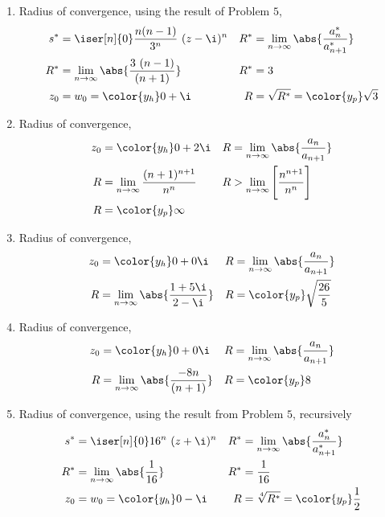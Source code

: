\begin{enumerate}
    \item Radius of convergence, using the result of Problem $ 5 $,
          \begin{align}
              s^* & = \iser[n]{0} \frac{n(n-1)}{3^n}\ (z-\i)^n          &
              R^* & = \lim_{n \to \infty} \abs{\frac{a_n^*}{a_{n+1}^*}}   \\
              R^* & = \lim_{n \to \infty} \abs{\frac{3\ (n-1)}{(n+1)}}  &
              R^* & = 3                                                   \\
              z_0 & = w_0 = \color{y_h} 0 + \i                          &
              R   & = \sqrt{R^*} = \color{y_p} \sqrt{3}
          \end{align}

    \item Radius of convergence,
          \begin{align}
              z_0 & = \color{y_h} 0 + 2\i                                 &
              R   & = \lim_{n \to \infty} \abs{\frac{a_n}{a_{n+1}}}         \\
              R   & = \lim_{n \to \infty} \frac{(n+1)^{n+1}}{n^n}         &
              R   & > \lim_{n \to \infty} \Bigg[\frac{n^{n+1}}{n^n}\Bigg]   \\
              R   & = \color{y_p} \infty
          \end{align}

    \item Radius of convergence,
          \begin{align}
              z_0 & = \color{y_h} 0 + 0\i                           &
              R   & = \lim_{n \to \infty} \abs{\frac{a_n}{a_{n+1}}}   \\
              R   & = \lim_{n \to \infty} \abs{\frac{1+5\i}{2-\i}}  &
              R   & = \color{y_p} \sqrt{\frac{26}{5}}
          \end{align}

    \item Radius of convergence,
          \begin{align}
              z_0 & = \color{y_h} 0 + 0\i                           &
              R   & = \lim_{n \to \infty} \abs{\frac{a_n}{a_{n+1}}}   \\
              R   & = \lim_{n \to \infty} \abs{\frac{-8n}{(n+1)}}   &
              R   & = \color{y_p} 8
          \end{align}

    \item Radius of convergence, using the result from Problem $ 5 $, recursively
          \begin{align}
              s^* & = \iser[n]{0} 16^n\ (z + \i)^n                      &
              R^* & = \lim_{n \to \infty} \abs{\frac{a_n^*}{a_{n+1}^*}}   \\
              R^* & = \lim_{n \to \infty} \abs{\frac{1}{16}}            &
              R^* & = \frac{1}{16}                                        \\
              z_0 & = w_0 = \color{y_h} 0 - \i                          &
              R   & = \sqrt[4]{R^*} = \color{y_p} \frac{1}{2}
          \end{align}


\end{enumerate}

